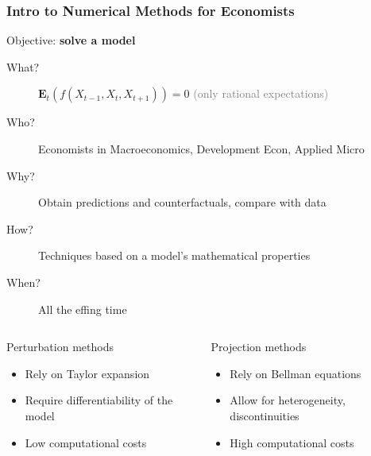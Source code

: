 \documentclass[10pt, aspectratio=1610, handout]{beamer}
\newcommand{\E}{\mathbf{E}}
\begin{document}
  \begin{frame}
    \frametitle{Intro to Numerical Methods for Economists}

    Objective: \textbf{solve a model}

    \vfill\pause

    \begin{description}
      \item[What?] $\E_t \left( f \left( X_{t-1}, X_t, X_{t+1} \right) \right) = 0$ \hspace{2em} \textcolor{gray}{(only rational expectations)}
      \pause
      \item[Who?] Economists in Macroeconomics, Development Econ, Applied Micro
      \pause
      \item[Why?] Obtain predictions and counterfactuals, compare with data
      \pause
      \item[How?] Techniques based on a model's mathematical properties
      \pause
      \item[When?] All the effing time
    \end{description}

    \vfill\pause

    \begin{columns}
      \begin{column}{0.475\textwidth}
        \begin{block}{Perturbation methods}
          \begin{itemize}
            \item Rely on Taylor expansion
            \item Require differentiability of the model
            \item Low computational costs
          \end{itemize}
        \end{block}
      \end{column}
      \begin{column}{0.475\textwidth}
        \begin{block}{Projection methods}
          \begin{itemize}
            \item Rely on Bellman equations
            \item Allow for heterogeneity, discontinuities
            \item High computational costs
          \end{itemize}
        \end{block}
      \end{column}
    \end{columns}

  \end{frame}
\end{document}
